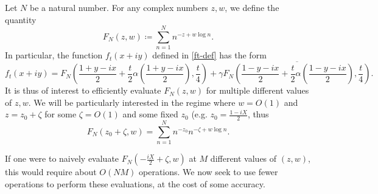 Let $N$ be a natural number.  For any complex numbers $z,w$, we define the quantity
$$ F_N(z,w) \coloneqq \sum_{n=1}^N  n^{-z + w \log n}.$$
In particular, the function $f_t(x+iy)$ defined in \eqref{ft-def} has the form
$$ f_t(x+iy) = F_N( \frac{1+y-ix}{2} + \frac{t}{2} \alpha(\frac{1+y-ix}{2}), \frac{t}{4} ) + \gamma \overline{F_N( \frac{1-y-ix}{2} + \frac{t}{2} \alpha(\frac{1-y-ix}{2}), \frac{t}{4} )}.$$
It is thus of interest to efficiently evaluate $F_N(z,w)$ for multiple different values of $z,w$.  We will be particularly interested in the regime where $w=O(1)$ and $z = z_0 + \zeta$ for some $\zeta = O(1)$ and some fixed $z_0$ (e.g. $z_0 = \frac{1-iX}{2}$, thus
$$F_N(z_0+\zeta, w) = \sum_{n=1}^N n^{-z_0} n^{-\zeta + w \log n}.$$

If one were to naively evaluate $F_N(-\frac{iX}{2}+\zeta, w)$ at $M$ different values of $(z,w)$, this would require about $O(NM)$ operations.  We now seek to use fewer operations to perform these evaluations, at the cost of some accuracy.

